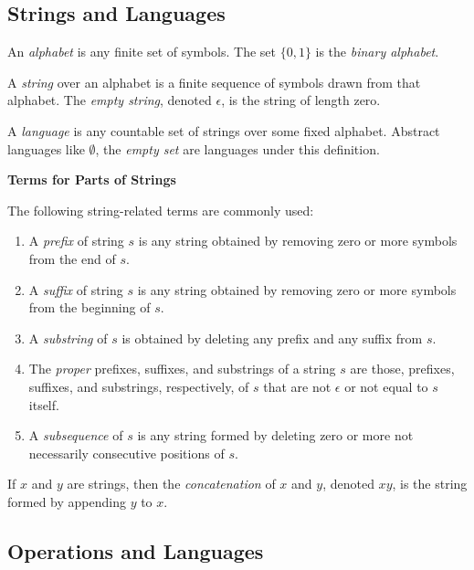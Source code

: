 \documentclass[a4paper,twoside]{book}
\begin{document}
\subsection{Strings and Languages}

An \textit{alphabet} is any finite set of symbols. The set $\{0,1\}$ is the \textit{binary alphabet}.

A \textit{string} over an alphabet is a finite sequence of symbols drawn from that alphabet. The \textit{empty string}, denoted $\epsilon$, is the string of length zero.

A \textit{language} is any countable set of strings over some fixed alphabet. Abstract languages like $\emptyset$, the \textit{empty set} are languages under this definition.

\begin{framed}
    \begin{center}
        \textbf{{\large Terms for Parts of Strings}}
    \end{center}

    The following string-related terms are commonly used:
    \begin{enumerate}
        \item A \textit{prefix} of string $s$ is any string obtained by removing zero or more symbols from the end of $s$.
        \item A \textit{suffix} of string $s$ is any string obtained by removing zero or more symbols from the beginning of $s$.
        \item A \textit{substring} of $s$ is obtained by deleting any prefix and any suffix from $s$.
        \item The \textit{proper} prefixes, suffixes, and substrings of a string $s$ are those, prefixes, suffixes, and substrings, respectively, of $s$ that are not $\epsilon$ or not equal to $s$ itself.
        \item A \textit{subsequence} of $s$ is any string formed by deleting zero or more not necessarily consecutive positions of $s$.
    \end{enumerate}
\end{framed}

If $x$ and $y$ are strings, then the \textit{concatenation} of $x$ and $y$, denoted $xy$, is the string formed by appending $y$ to $x$.

\subsection{Operations and Languages}
\end{document}
